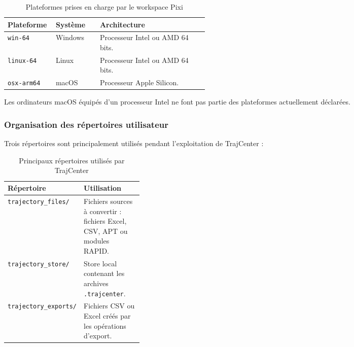 \documentclass{rapportENSAM}
\begin{document}
\begin{table}[ht]
    \centering
    \begin{tabularx}{\linewidth}{
        |p{0.24\linewidth}
        |p{0.22\linewidth}
        |X|
    }
        \hline
        \textbf{Plateforme} &
        \textbf{Système} &
        \textbf{Architecture} \\
        \hline

        \texttt{win-64} &
        Windows &
        Processeur Intel ou AMD 64 bits. \\
        \hline

        \texttt{linux-64} &
        Linux &
        Processeur Intel ou AMD 64 bits. \\
        \hline

        \texttt{osx-arm64} &
        macOS &
        Processeur Apple Silicon. \\
        \hline
    \end{tabularx}
    \caption{Plateformes prises en charge par le workspace Pixi}
    \label{tab:pc-supported-platforms}
\end{table}

Les ordinateurs macOS équipés d'un processeur Intel ne font pas partie des
plateformes actuellement déclarées.


\subsubsection{Organisation des répertoires utilisateur}
\label{subsubsec:pc-user-directories}

Trois répertoires sont principalement utilisés pendant l'exploitation de
TrajCenter :

\begin{table}[ht]
    \centering
    \begin{tabularx}{\linewidth}{
        |p{0.31\linewidth}
        |X|
    }
        \hline
        \textbf{Répertoire} &
        \textbf{Utilisation} \\
        \hline

        \texttt{trajectory\_files/} &
        Fichiers sources à convertir : fichiers Excel, CSV, APT ou modules
        RAPID. \\
        \hline

        \texttt{trajectory\_store/} &
        Store local contenant les archives \texttt{.trajcenter}. \\
        \hline

        \texttt{trajectory\_exports/} &
        Fichiers CSV ou Excel créés par les opérations d'export. \\
        \hline
    \end{tabularx}
    \caption{Principaux répertoires utilisés par TrajCenter}
    \label{tab:pc-user-directories}
\end{table}
\end{document}
